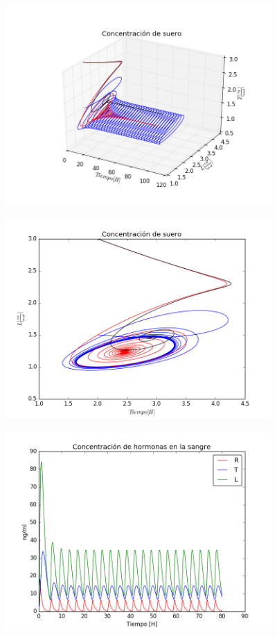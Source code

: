 \documentclass[10pt]{beamer}
\begin{document}
\begin{frame}
\begin{center}
 \includegraphics[width=4in]{imagenes/Graficas/g3_3D.png}
\end{center}
\end{frame}


\begin{frame}
\begin{center}
 \includegraphics[width=4in]{imagenes/Graficas/g4_2d.png}
\end{center}
\end{frame}

\begin{frame}
\begin{center}
 \includegraphics[width=4in]{imagenes/Graficas/g5_g2-modelo2.png}
\end{center}
\end{frame}
\end{document}

